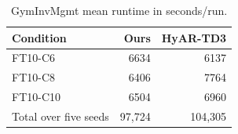 \begin{table}[t]\centering\small\caption{GymInvMgmt mean runtime in seconds/run.}\label{tab:gymrun}\begin{tabular}{lrr}\toprule Condition & Ours & HyAR-TD3\\\midrule FT10-C6 & 6634 & 6137\\ FT10-C8 & 6406 & 7764\\ FT10-C10 & 6504 & 6960\\\midrule Total over five seeds & 97,724 & 104,305\\\bottomrule\end{tabular}\end{table}
